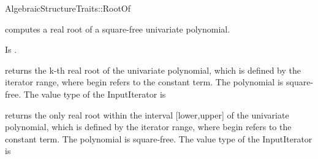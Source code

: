 \begin{ccRefConcept}{AlgebraicStructureTraits::RootOf}

\ccDefinition

 computes a real root of a square-free univariate
polynomial.

\ccRefines


\ccTypes
{} 
        { Is .}

\ccOperations
{}

        {returns the k-th real root of the univariate polynomial,
        which is defined by the iterator range,
        where begin refers to the constant term.
        \ccPrecond The polynomial is square-free.
        \ccPrecond The value type of the InputIterator is \\ }

\begin{ccAdvanced}
        {returns the only real root within the interval [lower,upper]
        of the univariate polynomial, which is defined by the iterator
        range, where begin refers to the constant term.
        \ccPrecond The polynomial is square-free.
        \ccPrecond The value type of the InputIterator is \\
}
\end{ccAdvanced}


\ccSeeAlso

\\

\end{ccRefConcept}
